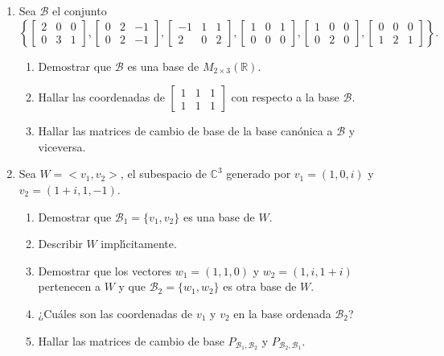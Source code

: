 \begin{enumerate}[topsep=6pt, itemsep=.4cm]
\item Sea $\mathcal{B}$ el conjunto 
$$
\left\{
\begin{bmatrix}
2 & 0& 0 \\
0 & 3& 1
\end{bmatrix},
\begin{bmatrix}
0& 2& -1\\
0& 2&-1
\end{bmatrix},
\begin{bmatrix}
-1 &1&1 \\
2 & 0 &2
\end{bmatrix},
\begin{bmatrix}
1 &0 &1\\
0 &0 &0
\end{bmatrix},
\begin{bmatrix}
1& 0& 0\\
0 &2 &0
\end{bmatrix},
\begin{bmatrix}
0 &0 & 0\\
1 & 2&1
\end{bmatrix}
\right\}.$$


\begin{enumerate}
    \item Demostrar que
    $\mathcal{B}$ es una base de $M_{2\times3}(\mathbb{R})$.
    \item Hallar las coordenadas de
    $
    \begin{bmatrix}
    1 & 1& 1 \\
    1 & 1& 1
    \end{bmatrix}$ con respecto a la base $\mathcal{B}$.
    \item Hallar las matrices de cambio de base de la base can\'onica
    a $\mathcal{B}$ y viceversa.
\end{enumerate}



\item Sea $W=<v_1,v_2>$, el subespacio de $\mathbb{C}^3$
generado por $v_1=(1,0,i)$ y $v_2=(1+i,1,-1)$.
\begin{enumerate}
    \item Demostrar que $\mathcal{B}_1=\{v_1,v_2\}$ es una base de $W$.
    \item Describir $W$ impl{\'\i}citamente.
    \item Demostrar que los vectores $w_1=(1,1,0)$ y
    $w_2=(1,i,1+i)$ pertenecen a $W$ y que $\mathcal{B}_2=\{w_1,w_2\}$
    es otra base de $W$.
    \item  ¿Cu{\'a}les son las coordenadas de $v_1$ y $v_2$ en la
    base ordenada $\mathcal{B}_2$?
    \item Hallar las matrices de cambio de base
    $P_{\mathcal{B}_1,\mathcal{B}_2}$ y $P_{\mathcal{B}_2,\mathcal{B}_1}$.
\end{enumerate}



\end{enumerate}
